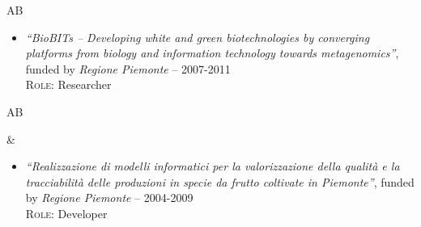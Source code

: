 \documentclass[a4paper,10pt]{article}
\newenvironment{doubletablelist}
{
	\vspace{-0.2cm}
	\begin{longtable}[!h]{AB}}{\end{longtable}
}
\newcommand{\dtlist}[2]{
\hspace{-3cm}
\noindent
	\begin{minipage}{0.24\textwidth}
	\begin{flushright}
	\textsc{#1}
	\end{flushright}
	\end{minipage}
	& #2\\[0.2cm]
}
\newcommand{\minusitem}{\item[-]}
\begin{document}
\begin{doubletablelist}
{\begin{itemize}
		\minusitem   \begin{minipage}{0.65\textwidth}
			\emph{``BioBITs -- Developing white and green biotechnologies by converging platforms from biology and information technology towards metagenomics''}, funded by \emph{Regione Piemonte} -- 2007-2011\\
			\textsc{Role:} Researcher
		\end{minipage}
	\end{itemize}
}
\end{doubletablelist}
	
\begin{doubletablelist}
\dtlist{}{
	\vspace{-0.8cm}
	\begin{itemize} %
	
		
		\minusitem  \begin{minipage}{0.65\textwidth}
			\emph{``Realizzazione di modelli informatici per la valorizzazione della qualit\`a e la tracciabilit\`a delle produzioni in specie da frutto coltivate in Piemonte''}, funded by \emph{Regione Piemonte} -- 2004-2009\\
			\textsc{Role:} Developer
		\end{minipage}		
	\end{itemize}
}





\end{doubletablelist}
\end{document}
